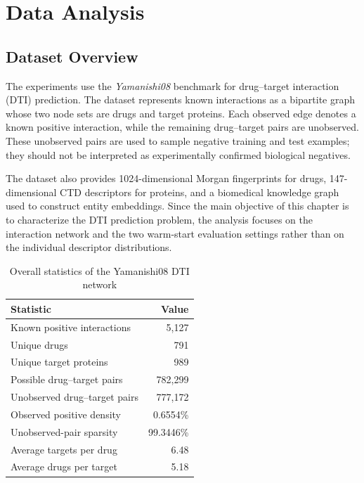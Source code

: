 \chapter{Data Analysis}
\label{chap:data}

\section{Dataset Overview}

The experiments use the \textit{Yamanishi08} benchmark for drug--target
interaction (DTI) prediction. The dataset represents known interactions as a
bipartite graph whose two node sets are drugs and target proteins. Each
observed edge denotes a known positive interaction, while the remaining
drug--target pairs are unobserved. These unobserved pairs are used to sample
negative training and test examples; they should not be interpreted as
experimentally confirmed biological negatives.

The dataset also provides 1024-dimensional Morgan fingerprints for drugs,
147-dimensional CTD descriptors for proteins, and a biomedical knowledge graph
used to construct entity embeddings. Since the main objective of this chapter
is to characterize the DTI prediction problem, the analysis focuses on the
interaction network and the two warm-start evaluation settings rather than on
the individual descriptor distributions.

\begin{table}[H]
\centering
\caption{Overall statistics of the Yamanishi08 DTI network}
\label{tab:yamanishi_dti_stats}
\begin{tabular}{lr}
\toprule
\textbf{Statistic} & \textbf{Value} \\
\midrule
Known positive interactions & 5,127 \\
Unique drugs & 791 \\
Unique target proteins & 989 \\
Possible drug--target pairs & 782,299 \\
Unobserved drug--target pairs & 777,172 \\
Observed positive density & 0.6554\% \\
Unobserved-pair sparsity & 99.3446\% \\
Average targets per drug & 6.48 \\
Average drugs per target & 5.18 \\
\bottomrule
\end{tabular}
\end{table}

